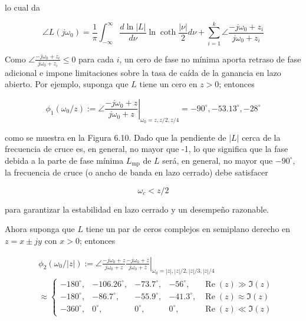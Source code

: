 lo cual da


\begin{equation*}
\angle L\left(j \omega_{0}\right)=\frac{1}{\pi} \int_{-\infty}^{\infty} \frac{d \ln |L|}{d \nu} \ln \operatorname{coth} \frac{|\nu|}{2} d \nu+\sum_{i=1}^{k} \angle \frac{-j \omega_{0}+z_{i}}{j \omega_{0}+z_{i}} \tag{6.12}
\end{equation*}


Como $\angle \frac{-j \omega_{0}+z_{i}}{j \omega_{0}+z_{i}} \leq 0$ para cada $i$, un cero de fase no mínima aporta retraso de fase adicional e impone limitaciones sobre la tasa de caída de la ganancia en lazo abierto. Por ejemplo, suponga que $L$ tiene un cero en $z>0$; entonces

$$
\phi_{1}\left(\omega_{0} / z\right):=\left.\angle \frac{-j \omega_{0}+z}{j \omega_{0}+z}\right|_{\omega_{0}=z, z / 2, z / 4}=-90^{\circ},-53.13^{\circ},-28^{\circ}
$$

como se muestra en la Figura 6.10. Dado que la pendiente de $|L|$ cerca de la frecuencia de cruce es, en general, no mayor que -1, lo que significa que la fase debida a la parte de fase mínima $L_{\mathrm{mp}}$ de $L$ será, en general, no mayor que $-90^{\circ}$, la frecuencia de cruce (o ancho de banda en lazo cerrado) debe satisfacer


\begin{equation*}
\omega_{c}<z / 2 \tag{6.13}
\end{equation*}


para garantizar la estabilidad en lazo cerrado y un desempeño razonable.

Ahora suponga que $L$ tiene un par de ceros complejos en semiplano derecho en $z=x \pm j y$ con $x>0$; entonces

$$
\begin{aligned}
& \phi_2\left(\omega_0 /|z|\right):=\left.\angle \frac{-j \omega_0+z}{j \omega_0+z} \frac{-j \omega_0+\bar{z}}{j \omega_0+\bar{z}}\right|_{\omega_0=|z|,|z| / 2,|z| / 3,|z| / 4} \\
& \approx\left\{\begin{array}{rrrrl}
-180^{\circ}, & -106.26^{\circ}, & -73.7^{\circ}, & -56^{\circ}, & \operatorname{Re}(z) \gg \Im(z) \\
-180^{\circ}, & -86.7^{\circ}, & -55.9^{\circ}, & -41.3^{\circ}, & \operatorname{Re}(z) \approx \Im(z) \\
-360^{\circ}, & 0^{\circ}, & 0^{\circ}, & 0^{\circ}, & \operatorname{Re}(z) \ll \Im(z)
\end{array}\right.
\end{aligned}
$$


